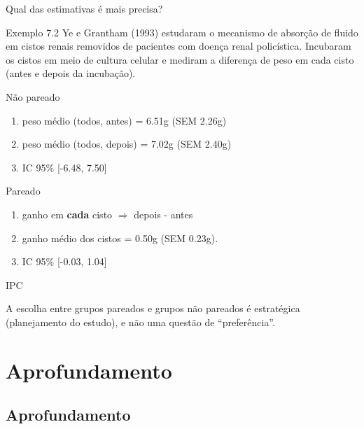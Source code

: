 \documentclass{beamer}
\begin{document}
\begin{frame}{Qual das estimativas é mais precisa?}
  \begin{exampleblock}{Exemplo 7.2}
    \footnotesize
    Ye e Grantham (1993) estudaram o mecanismo de absorção de fluido em cistos renais removidos de pacientes com doença renal policística.
    Incubaram os cistos em meio de cultura celular e mediram a diferença de peso em cada cisto (antes e depois da incubação).

    \scriptsize
    \begin{exampleblock}{Não pareado}
      \begin{enumerate}
      \item<2,4> peso médio (todos, antes) = 6.51g (SEM 2.26g)
      \item<2,4> peso médio (todos, depois) = 7.02g (SEM 2.40g)
      \item<2,4> IC 95\% [-6.48, 7.50]
      \end{enumerate}
    \end{exampleblock}
    \begin{exampleblock}{Pareado}
      \begin{enumerate}
      \item<3,4> ganho em {\bf cada} cisto $\Rightarrow$ depois - antes
      \item<3,4> ganho médio dos cistos = 0.50g (SEM 0.23g).
      \item<3,4> IC 95\% [-0.03, 1.04]
      \end{enumerate}
    \end{exampleblock}
  \end{exampleblock}
\end{frame}

\begin{frame}{IPC}
  \begin{block}{}
    A escolha entre grupos pareados e grupos não pareados é estratégica (planejamento do estudo), e não uma questão de ``preferência''.
  \end{block}
\end{frame}
\section{Aprofundamento}

\subsection{Aprofundamento}
\end{document}
